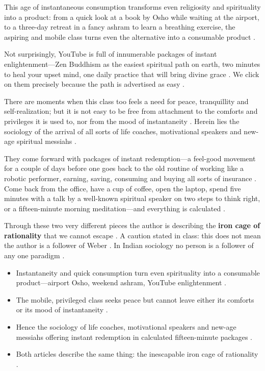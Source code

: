This age of instantaneous consumption transforms even religiosity and spirituality into a product: from a quick look at a book by Osho while waiting at the airport, to a three-day retreat in a fancy ashram to learn a breathing exercise, the aspiring and mobile class turns even the alternative into a consumable product .

Not surprisingly, YouTube is full of innumerable packages of instant enlightenment---Zen Buddhism as the easiest spiritual path on earth, two minutes to heal your upset mind, one daily practice that will bring divine grace . We click on them precisely because the path is advertised as easy .

There are moments when this class too feels a need for peace, tranquillity and self-realization; but it is not easy to be free from attachment to the comforts and privileges it is used to, nor from the mood of instantaneity . Herein lies the sociology of the arrival of all sorts of life coaches, motivational speakers and new-age spiritual messiahs .

They come forward with packages of instant redemption---a feel-good movement for a couple of days before one goes back to the old routine of working like a robotic performer, earning, saving, consuming and buying all sorts of insurance . Come back from the office, have a cup of coffee, open the laptop, spend five minutes with a talk by a well-known spiritual speaker on two steps to think right, or a fifteen-minute morning meditation---and everything is calculated .

\begin{KeyConcept}
Through these two very different pieces the author is describing the \textbf{iron cage of rationality} that we cannot escape .
A caution stated in class: this does not mean the author is a follower of Weber . In Indian sociology no person is a follower of any one paradigm .
\end{KeyConcept}

\begin{QuickRevision}
\begin{itemize}
    \item Instantaneity and quick consumption turn even spirituality into a consumable product---airport Osho, weekend ashram, YouTube enlightenment .
    \item The mobile, privileged class seeks peace but cannot leave either its comforts or its mood of instantaneity .
    \item Hence the sociology of life coaches, motivational speakers and new-age messiahs offering instant redemption in calculated fifteen-minute packages .
    \item Both articles describe the same thing: the inescapable iron cage of rationality .
\end{itemize}
\end{QuickRevision}


